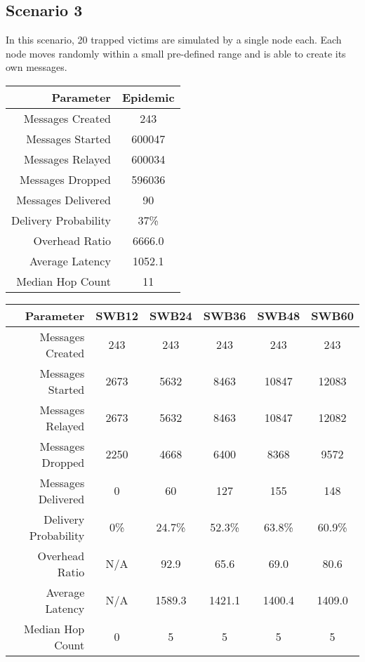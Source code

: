 \documentclass{article}
\begin{document}
\subsection{Scenario 3}
In this scenario, 20 trapped victims are simulated by a single node each. Each node moves randomly within a small pre-defined range and is able to create its own messages.

\begin{center}
\begin{tabular}{|r|c|}
\hline
\textbf{Parameter} & \textbf{Epidemic} \\ \hline
Messages Created & 243 \\ \hline
Messages Started & 600047 \\ \hline
Messages Relayed & 600034 \\ \hline
Messages Dropped & 596036 \\ \hline
Messages Delivered & 90 \\ \hline
Delivery Probability & 37\%\\ \hline
Overhead Ratio & 6666.0 \\ \hline
Average Latency & 1052.1 \\ \hline
Median Hop Count & 11 \\ \hline
\end{tabular}
\end{center}

\begin{center}
\begin{tabular}{|r|c|c|c|c|c|}
\hline
\textbf{Parameter} & \textbf{SWB12} & \textbf{SWB24} & \textbf{SWB36} & \textbf{SWB48} & \textbf{SWB60} \\ \hline
Messages Created & 243 & 243 & 243 & 243 & 243 \\ \hline
Messages Started & 2673 & 5632 & 8463 & 10847 & 12083 \\ \hline
Messages Relayed & 2673 & 5632 & 8463 & 10847 & 12082 \\ \hline
Messages Dropped & 2250 & 4668 & 6400 & 8368 & 9572 \\ \hline
Messages Delivered & 0 & 60 & 127 & 155 & 148 \\ \hline
Delivery Probability & 0\% & 24.7\% & 52.3\% & 63.8\% & 60.9\% \\ \hline
Overhead Ratio & N/A & 92.9 & 65.6 & 69.0 & 80.6 \\ \hline
Average Latency & N/A & 1589.3 & 1421.1 & 1400.4 & 1409.0 \\ \hline
Median Hop Count & 0 & 5 & 5 & 5 & 5 \\ \hline
\end{tabular}
\end{center}
\end{document}
